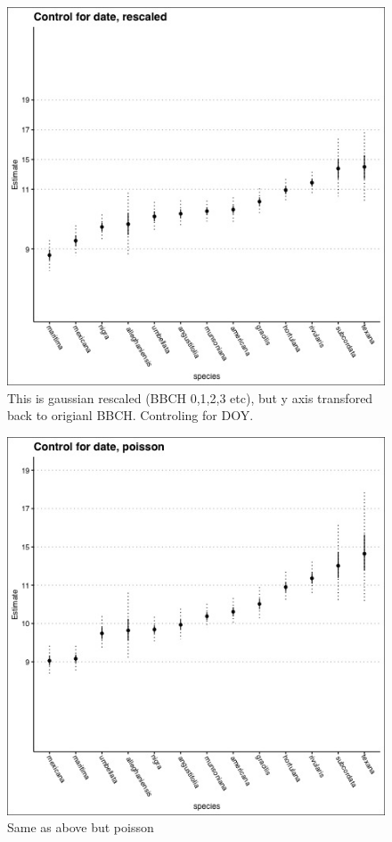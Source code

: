 \documentclass[12pt]{article}\usepackage[]{graphicx}\usepackage[]{color}
\begin{document}
    \begin{figure}[h!]
        \centering
         \includegraphics[width=\textwidth]{..//Plots/seeminglybestplot_rescaled.jpeg}
                 \caption{This is gaussian rescaled (BBCH 0,1,2,3 etc), but y axis transfored back to origianl BBCH. Controling for DOY.}
    \end{figure}  
    
     \begin{figure}[h!]
        \centering
         \includegraphics[width=\textwidth]{..//Plots/seeminglybestplot_poisson.jpeg}
                 \caption{Same as above but poisson}
    \end{figure}
    
\end{document}
